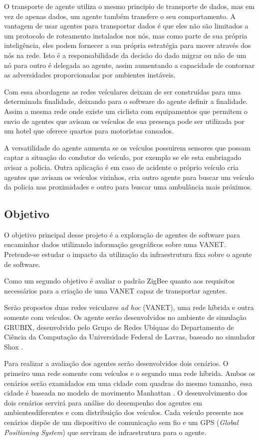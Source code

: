 O transporte de agente utiliza o mesmo principio de transporte de dados, mas em vez de apenas dados, um agente também transfere o seu comportamento. A vantagem de usar agentes para transportar dados é que eles não são limitados a um protocolo de roteamento instalados nos nós, mas como parte de sua própria inteligência, eles podem fornecer a sua própria estratégia para mover através dos nós na rede. Isto é a responsabilidade da decisão do dado migrar ou não de um nó para outro é delegada ao agente, assim aumentando a capacidade de contornar as adversidades proporcionadas por ambientes instáveis.

Com essa abordagens as redes veículares deixam de ser construídas para uma determinada finalidade, deixando para o software do agente definir a finalidade. Assim a mesma rede onde existe um ciclista com equipamentos que permitem o envio de agentes que avisam os veículos de sua presença pode ser utilizada por um hotel que oferece quartos para motoristas cansados. 

A versatilidade do agente aumenta se os veículos possuirem sensores que possam captar a situação do condutor do veículo, por exemplo se ele esta embriagado avisar a policia. Outra aplicação é em caso de acidente o próprio veículo cria agentes que avisam os veículos vizinhos, cria outro agente para buscar um veículo da policia nas proximidades e outro para buscar uma ambulância mais próximos.   

\subsection{Objetivo}

O objetivo principal desse projeto é a exploração de agentes de software para encaminhar dados utilizando informação geográficos sobre uma VANET. Pretende-se estudar o impacto da utilização da infraestrutura fixa sobre o agente de software.

Como um segundo objetivo é avaliar o padrão ZigBee quanto aos requisitos necessários para a criação de uma VANET capaz de transportar agentes. 

Serão propostos duas redes veiculares \emph{ad hoc} (VANET), uma rede híbrida e outra somente com veículos. Os agente serão desenvolvidos no ambiente de simulação GRUBIX, desenvolvido pelo Grupo de Redes Ubíquas do Departamento de Ciência da Computação da Universidade Federal de Lavras, baseado no simulador Shox \cite{Lessmann:2008}.

Para realizar a avaliação dos agentes serão desenvolvidos dois cenários. O primeiro uma rede somente com veículos e o segundo uma rede híbrida. Ambos os cenários serão examidados em uma cidade com quadras do mesmo tamanho, essa cidade é baseada no modelo de movimento Manhattan \cite{Bai:2003}. O desenvolvimento dos dois cenários servirá para análise do desempenho dos agentes em ambientesdiferentes e com distribuição dos veículos. Cada veículo presente nos cenários dispõe de um dispositivo de comunicação sem fio e um GPS (\emph{Global Positioning System}) que serviram de infraestrutura para o agente. 

